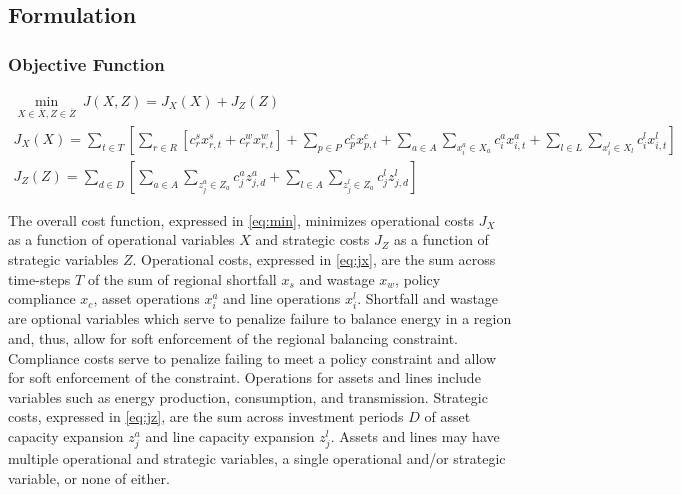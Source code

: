 \documentclass[12pt]{article}
\begin{document}
\subsection{Formulation}

\subsubsection{Objective Function}

\begin{gather}
	\min_{X \in \overline{X}, Z \in \overline{Z}} \ J(X, Z) = J_X(X) + J_Z(Z)\label{eq:min} \\
	J_X(X) = \sum_{t \in T}\left[\sum_{r \in R} [c^s_rx^s_{r, t} + c^w_rx^w_{r, t}] + \sum_{p \in P} c^c_px^c_{p, t} + \sum_{a \in A}\sum_{x^a_i \in X_a} c^a_ix^a_{i, t} + \sum_{l \in L}\sum_{x^l_i \in X_l} c^l_ix^l_{i, t}\right]\label{eq:jx} \\
	J_Z(Z) = \sum_{d \in D}\left[\sum_{a \in A}\sum_{z^a_j \in Z_a} c^a_jz^a_{j, d} + \sum_{l \in A}\sum_{z^l_j \in Z_a} c^l_jz^l_{j, d}\right]\label{eq:jz}
\end{gather}


The overall cost function, expressed in \eqref{eq:min}, minimizes operational costs $J_X$ as a function of operational variables $X$ and strategic costs $J_Z$ as a function of strategic variables $Z$. Operational costs, expressed in  \eqref{eq:jx}, are the sum across time-steps $T$ of the sum of regional shortfall $x_s$ and wastage $x_w$, policy compliance $x_c$, asset operations $x^a_i$ and line operations $x^l_i$. Shortfall and wastage are optional variables which serve to penalize failure to balance energy in a region and, thus, allow for soft enforcement of the regional balancing constraint. Compliance costs serve to penalize failing to meet a policy constraint and allow for soft enforcement of the constraint. Operations for assets and lines include variables such as energy production, consumption, and transmission. Strategic costs, expressed in \eqref{eq:jz}, are the sum across investment periods $D$ of asset capacity expansion $z^a_j$ and line capacity expansion $z^l_j$. Assets and lines may have multiple operational and strategic variables, a single operational and/or strategic variable, or none of either.
\end{document}
